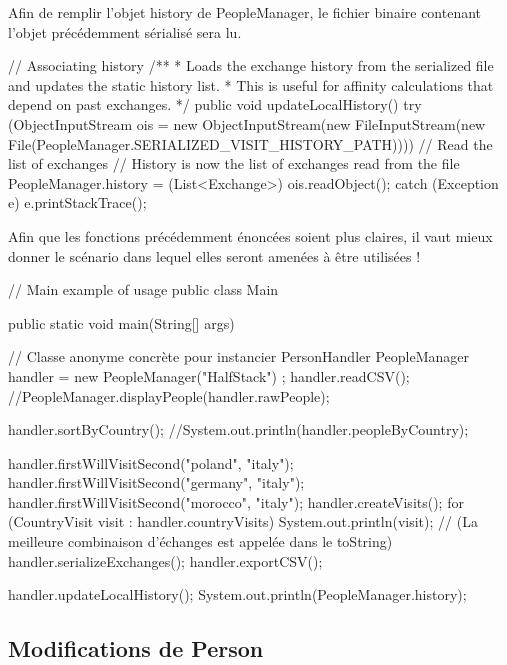 \documentclass{mytex}
\begin{document}
Afin de remplir l'objet history de PeopleManager, le fichier binaire contenant l'objet précédemment sérialisé sera lu.

\begin{codebox}
// Associating history  
/**
* Loads the exchange history from the serialized file and updates the static history list.
* This is useful for affinity calculations that depend on past exchanges.
*/
public void updateLocalHistory() {
	try (ObjectInputStream ois = new ObjectInputStream(new FileInputStream(new File(PeopleManager.SERIALIZED_VISIT_HISTORY_PATH)))) {
		// Read the list of exchanges
		// History is now the list of exchanges read from the file
		PeopleManager.history = (List<Exchange>) ois.readObject();
	} catch (Exception e) {
		e.printStackTrace();
	}
}

\end{codebox}


Afin que les fonctions précédemment énoncées soient plus claires, il vaut mieux donner le scénario dans lequel elles seront amenées à être utilisées ! 

\begin{codebox}
// Main example of usage
public class Main {
	public static void main(String[] args) {
		// Classe anonyme concrète pour instancier PersonHandler
		PeopleManager handler = new PeopleManager("HalfStack") {};
		handler.readCSV();
		//PeopleManager.displayPeople(handler.rawPeople);
		
		handler.sortByCountry();
		//System.out.println(handler.peopleByCountry);
		
		handler.firstWillVisitSecond("poland", "italy");
		handler.firstWillVisitSecond("germany", "italy");
		handler.firstWillVisitSecond("morocco", "italy");
		handler.createVisits();
		for (CountryVisit visit : handler.countryVisits) {
			System.out.println(visit); 
			// (La meilleure combinaison d'échanges est appelée dans le toString)
		}
		handler.serializeExchanges();
		handler.exportCSV();
		
		handler.updateLocalHistory();
		System.out.println(PeopleManager.history);
	}
}
\end{codebox}


\subsection{Modifications de Person}
\end{document}
